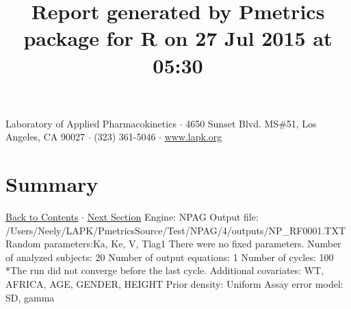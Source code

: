 \documentclass{article}
\title{Report generated by Pmetrics package for R on 27 Jul 2015 at 05:30 }
\date{}
\begin{document}
              \maketitle 
Laboratory of Applied Pharmacokinetics $\cdot$ 4650 Sunset Blvd. MS\#51, Los Angeles, CA 90027 $\cdot$ (323) 361-5046 $\cdot$ \href{http://www.lapk.org}{www.lapk.org} 
\hypertarget{tableofcontents}{}
        \tableofcontents
        \newpage 
\section{Summary} \hyperlink{tableofcontents}{Back to Contents} $\cdot$ \hyperlink{cycleinfo}{Next Section}\newline
 \newline 
Engine: NPAG\newline 
Output file: /Users/Neely/LAPK/PmetricsSource/Test/NPAG/4/outputs/NP\_RF0001.TXT\newline 
Random parameters:Ka, Ke, V, Tlag1\newline 
There were no fixed parameters. \newline 
Number of analyzed subjects:  20 \newline 
Number of output equations:  1 \newline 
Number of cycles:  100     *The run did not converge before the last cycle. \newline 
Additional covariates:  WT, AFRICA, AGE, GENDER, HEIGHT \newline 
Prior density: Uniform \newline Assay error model: SD, gamma \newline  \newline 
\newpage
            \hypertarget{cycleinfo}{}
            
\end{document}

